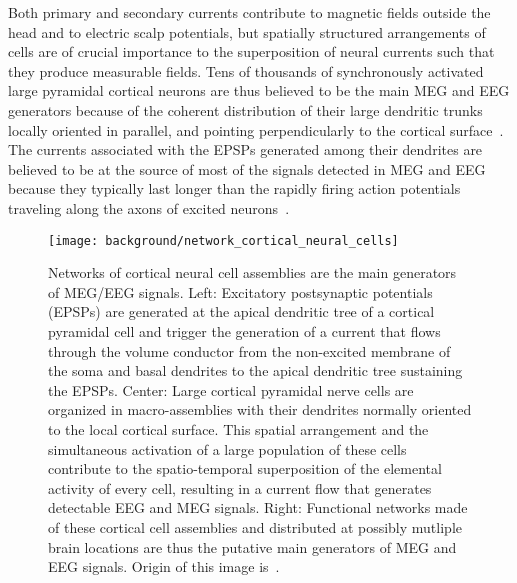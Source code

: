 Both primary and secondary currents contribute to magnetic fields outside the head and to electric scalp potentials, but spatially structured arrangements of cells are of crucial importance to the superposition of neural currents such that they produce measurable fields. Tens of thousands of synchronously activated large pyramidal cortical neurons are thus believed to be the main MEG and EEG generators because of the coherent distribution of their large dendritic trunks locally oriented in parallel, and pointing perpendicularly to the cortical surface~\cite{nunez2000relationship}. The currents associated with the EPSPs generated among their dendrites are believed to be at the source of most of the signals detected in MEG and EEG because they typically last longer than the rapidly firing action potentials traveling along the axons of excited neurons~\cite{nunez2006electric}. %

\begin{figure}
	\centering
	\texttt{[image: background/network\_cortical\_neural\_cells]}
    \caption{Networks of cortical neural cell assemblies are the main generators of MEG/EEG signals. Left: Excitatory postsynaptic potentials (EPSPs) are generated at the apical dendritic tree of a cortical pyramidal cell and trigger the generation of a current that flows through the volume conductor from the non-excited membrane of the soma and basal dendrites to the apical dendritic tree sustaining the EPSPs. Center:  Large cortical pyramidal nerve cells are organized in macro-assemblies with their dendrites normally oriented to the local cortical surface. This spatial arrangement
and the simultaneous activation of a large population of these cells contribute to the spatio-temporal superposition of the elemental activity of every cell, resulting in a current flow that generates detectable EEG and MEG signals. Right: Functional networks made of these cortical cell assemblies and distributed at possibly mutliple brain locations are thus the putative main generators of MEG and EEG signals. Origin of this image is~\cite{baillet2001electromagnetic}.
    }
    \label{fig:network_cortical_neural_cells}
\end{figure}

